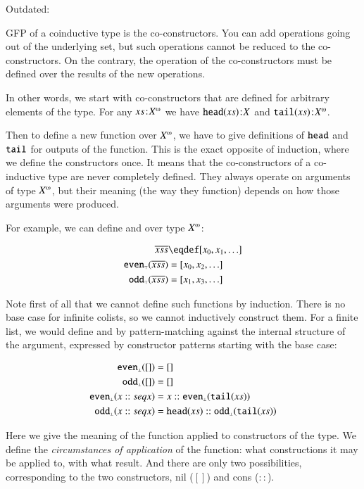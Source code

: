 Outdated:

GFP of a coinductive type is the co-constructors. You can add
operations going out of the underlying set, but such operations cannot
be reduced to the co-constructors. On the contrary, the operation of
the co-constructors must be defined over the results of the new
operations.

In other words, we start with co-constructors that are defined for
arbitrary elements of the type. For any \(\tj{\seq{x}}{\colist X}\) we have
\(\texttt{\upshape head}(xs)\hspace{1pt}\mathpunct{:}\hspace{-1pt}X\) and \(\tj{\tail(\seq{x})}{\colist X}\).

Then to define a new function over \(\colist X\), we have to give
definitions of \(\texttt{\upshape head}\) and \(\texttt{\upshape tail}\) for outputs of the function.
This is the exact opposite of induction, where we define the
constructors once. It means that the co-constructors of a co-inductive
type are never completely defined. They always operate on arguments of
type \(\colist X\), but their meaning (the way they function) depends
on how those arguments were produced.

For example, we can define  and  over type
\(\colist{X}\):

\begin{align}
  \coseq{\seq{x}} & \defeq [x_0, x_1, \ldots] \\
  \codefn{even}(\coseq{\seq{x}}) & = [x_0, x_2, \ldots] \\
  \codefn{odd}(\coseq{\seq{x}})  & = [x_1, x_3, \ldots]
\end{align}

Note first of all that we cannot define such functions by induction.
There is no base case for infinite colists, so we cannot inductively
construct them. For a finite list, we would define  and
 by pattern-matching against the internal structure of the
argument, expressed by constructor patterns starting with the base case:

\begin{align}
  \texttt{\upshape even}_{\scriptscriptstyle\bot}([]) & = [] \\
  \texttt{\upshape odd}_{\scriptscriptstyle\bot}([]) & = [] \\
  \texttt{\upshape even}_{\scriptscriptstyle\bot}(x::seq{x}) & = x::\texttt{\upshape even}_{\scriptscriptstyle\bot}(\texttt{\upshape tail}(xs)) \\
  \texttt{\upshape odd}_{\scriptscriptstyle\bot}(x::seq{x}) & = \texttt{\upshape head}(xs)::\texttt{\upshape odd}_{\scriptscriptstyle\bot}(\texttt{\upshape tail}(xs))
\end{align}

Here we give the meaning of the function applied to constructors of
the type. We define the \textit{circumstances of application} of the
function: what constructions it may be applied to, with what result.
And there are only two possibilities, corresponding to the two
constructors, nil (\([]\)) and cons (\(::\)).

